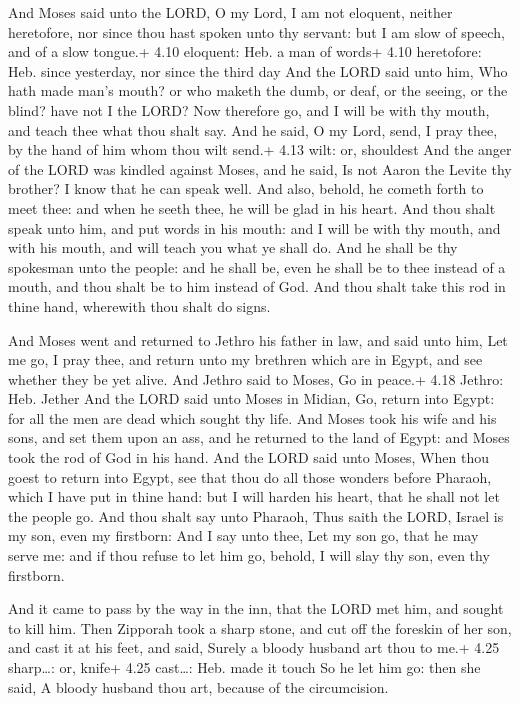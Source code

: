  And Moses said unto the LORD, O my Lord, I am not
eloquent, neither heretofore, nor since thou hast spoken unto thy
servant: but I am slow of speech, and of a slow tongue.+ 4.10 eloquent:
Heb. a man of words+ 4.10 heretofore: Heb. since yesterday, nor since
the third day  And the LORD said unto him, Who hath made
man's mouth? or who maketh the dumb, or deaf, or the seeing, or the
blind? have not I the LORD?  Now therefore go, and I will
be with thy mouth, and teach thee what thou shalt say.  And
he said, O my Lord, send, I pray thee, by the hand of him whom thou wilt
send.+ 4.13 wilt: or, shouldest  And the anger of the LORD
was kindled against Moses, and he said, Is not Aaron the Levite thy
brother? I know that he can speak well. And also, behold, he cometh
forth to meet thee: and when he seeth thee, he will be glad in his
heart.  And thou shalt speak unto him, and put words in his
mouth: and I will be with thy mouth, and with his mouth, and will teach
you what ye shall do.  And he shall be thy spokesman unto
the people: and he shall be, even he shall be to thee instead of a
mouth, and thou shalt be to him instead of God.  And thou
shalt take this rod in thine hand, wherewith thou shalt do signs.

 And Moses went and returned to Jethro his father in law,
and said unto him, Let me go, I pray thee, and return unto my brethren
which are in Egypt, and see whether they be yet alive. And Jethro said
to Moses, Go in peace.+ 4.18 Jethro: Heb. Jether  And the
LORD said unto Moses in Midian, Go, return into Egypt: for all the men
are dead which sought thy life.  And Moses took his wife
and his sons, and set them upon an ass, and he returned to the land of
Egypt: and Moses took the rod of God in his hand.  And the
LORD said unto Moses, When thou goest to return into Egypt, see that
thou do all those wonders before Pharaoh, which I have put in thine
hand: but I will harden his heart, that he shall not let the people go.
 And thou shalt say unto Pharaoh, Thus saith the LORD,
Israel is my son, even my firstborn:  And I say unto thee,
Let my son go, that he may serve me: and if thou refuse to let him go,
behold, I will slay thy son, even thy firstborn.

 And it came to pass by the way in the inn, that the LORD
met him, and sought to kill him.  Then Zipporah took a
sharp stone, and cut off the foreskin of her son, and cast it at his
feet, and said, Surely a bloody husband art thou to me.+ 4.25
sharp\ldots: or, knife+ 4.25 cast\ldots: Heb. made it touch
 So he let him go: then she said, A bloody husband thou
art, because of the circumcision.

